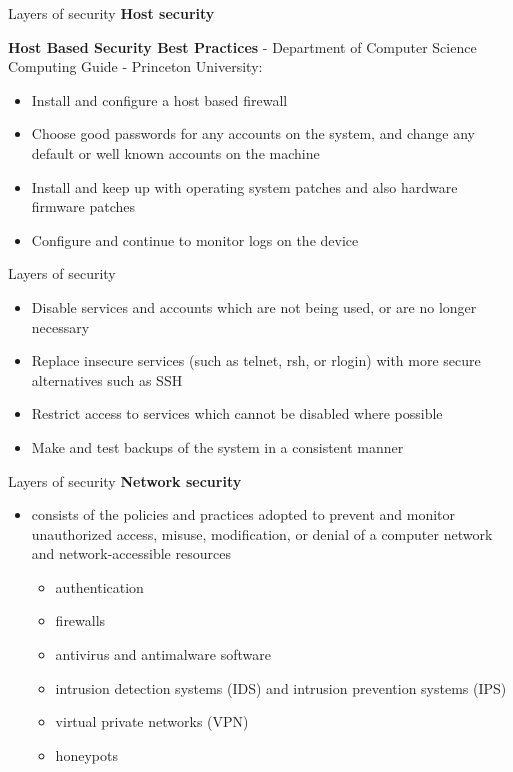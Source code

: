 \documentclass[pdf]{beamer}
\begin{document}
\begin{frame}{Layers of security}
\textbf{Host security}

\textbf{Host Based Security Best Practices} - Department of Computer Science Computing Guide - Princeton University:

\begin{itemize}
\item
Install and configure a host based firewall

\item
Choose good passwords for any accounts on the system, and change any default or well known accounts on the machine

\item
Install and keep up with operating system patches and also hardware firmware patches

\item
Configure and continue to monitor logs on the device

\end{itemize}
\end{frame}



\begin{frame}{Layers of security}
\begin{itemize}
\item
Disable services and accounts which are not being used, or are no longer necessary

\item
Replace insecure services (such as telnet, rsh, or rlogin) with more secure alternatives such as SSH

\item
Restrict access to services which cannot be disabled where possible

\item
Make and test backups of the system in a consistent manner

\end{itemize}
\end{frame}



\begin{frame}{Layers of security}
\textbf{Network security}
\begin{itemize}
\item
consists of the policies and practices adopted to prevent and monitor unauthorized access, misuse, modification, or denial of a computer network and network-accessible resources
\begin{itemize}
\item
authentication
\item
firewalls
\item
antivirus and antimalware software
\item
intrusion detection systems (IDS) and intrusion prevention systems (IPS)
\item
virtual private networks (VPN)
\item
honeypots
\end{itemize}
\end{itemize}
\end{frame}
\end{document}
